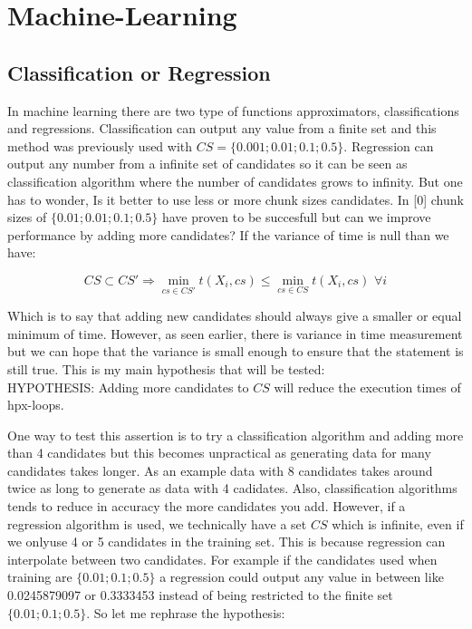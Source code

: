 \documentclass[12pt]{article}
\begin{document}
\section{Machine-Learning}

\subsection{Classification or Regression}
In machine learning there are two type of functions approximators, classifications and regressions. Classification can output any value from a finite set and this method was previously used with $CS=\{0.001;0.01;0.1;0.5\}.$ Regression can output any number from a infinite set of candidates so it can be seen as classification algorithm where the number of candidates grows to infinity. But one has to wonder, Is it better to use less or more chunk sizes candidates. In [0] chunk sizes of $\{0.01;0.01;0.1;0.5\}$ have proven to be succesfull but can we improve performance by adding more candidates? If the variance of time is null than we have:

$$CS \subset CS' \Rightarrow \underset{cs \in CS'}{\min}t(X_i,cs)\leq \underset{cs \in CS}{\min}t(X_i,cs) \, \, \forall i$$

Which is to say that adding new candidates should always give a smaller or equal minimum of time. However, as seen earlier, there is variance in time measurement but we can hope that the variance is small enough to ensure that the statement is still true. This is my main hypothesis that will be tested:\\

HYPOTHESIS: Adding more candidates to $CS$ will reduce the execution times of hpx-loops.


 One way to test this assertion is to try a classification algorithm and adding more than 4 candidates but this becomes unpractical as generating data for many candidates takes longer. As an example data with 8 candidates takes around twice as long to generate as data with 4 cadidates. Also, classification algorithms tends to reduce in accuracy the more candidates you add. However, if a regression algorithm is used, we technically have a set $CS$ which is infinite, even if we onlyuse  4 or 5 candidates in the training set. This is because regression can interpolate between two candidates. For example if the candidates used when training are $\{0.01;0.1;0.5\}$ a regression could output any value in between like 0.0245879097 or 0.3333453 instead of being restricted to the finite set $\{0.01;0.1;0.5\}$.
 So let me rephrase the hypothesis:
 
\end{document}
